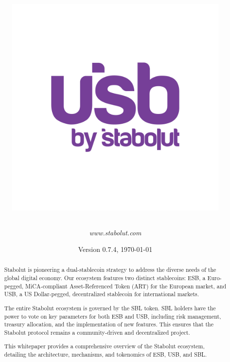 \documentclass[11pt, a4paper]{article} %
\title{
\begin{figure}[h] %
    \centering %
\includegraphics[scale=0.1]{figure/usblogo.png} %
\end{figure}
} %
\author{
     \textit{www.stabolut.com} %
  }
\date{Version 0.7.4, \today} %
\begin{document}
\maketitle %

\begin{abstract}
Stabolut is pioneering a dual-stablecoin strategy to address the diverse needs of the global digital economy. Our ecosystem features two distinct stablecoins: ESB, a Euro-pegged, MiCA-compliant Asset-Referenced Token (ART) for the European market, and USB, a US Dollar-pegged, decentralized stablecoin for international markets.

The entire Stabolut ecosystem is governed by the SBL token. SBL holders have the power to vote on key parameters for both ESB and USB, including risk management, treasury allocation, and the implementation of new features. This ensures that the Stabolut protocol remains a community-driven and decentralized project.

This whitepaper provides a comprehensive overview of the Stabolut ecosystem, detailing the architecture, mechanisms, and tokenomics of ESB, USB, and SBL.
\end{abstract}
\end{document}
